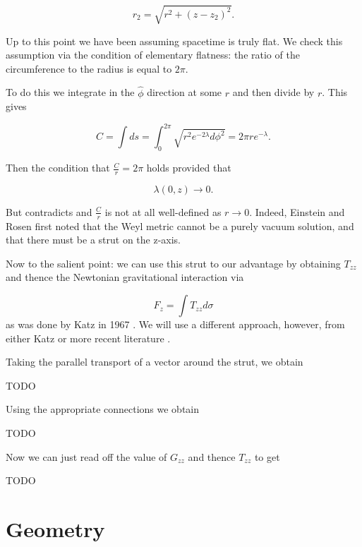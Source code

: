 \documentclass[12pt]{article}
\begin{document}
\begin{equation}
r_2=\sqrt{r^2+(z-z_2)^2}.
\label{eq:r_2}
\end{equation}

Up to this point we have been assuming spacetime is truly flat. We check this assumption via the condition of elementary flatness: the ratio of the circumference to the radius is equal to $2\pi$. 

To do this we integrate in the $\hat{\phi}$ direction at
some $r$ and then divide by $r$. This gives

\begin{equation}
  \label{eq:phi-hat-length}
  C=\int ds =
  \int_0^{2\pi}\sqrt{r^2e^{-2\lambda}d\phi^2}={2\pi re^{-\lambda}}.
\end{equation}

Then the condition that $\frac{C}{r}=2\pi$ holds provided that

\begin{equation}
	\label{eq:lambda-elem-flat}
	\lambda(0,z)\rightarrow 0.
\end{equation} 

But  contradicts  and $\frac{C}{r}$ is not at all well-defined as $r\rightarrow 0$. Indeed, Einstein and Rosen \cite{einstein-rosen-1936} first noted that the Weyl metric cannot be a purely vacuum solution, and that there must be a strut on the z-axis.

Now to the salient point: we can use this strut to our advantage by obtaining $T_{zz}$ and thence the Newtonian gravitational interaction via

\begin{equation}
	\label{eq:F_z}
	F_{z}=\int T_{zz}d\sigma
\end{equation}
as was done by Katz in 1967 \cite{katz1967derivation}. We will use a different approach, however, from either Katz or more recent literature \cite{letelier_superposition_1997}.

Taking the parallel transport of a vector around the strut, we obtain

TODO

Using the appropriate connections we obtain

TODO

Now we can just read off the value of $G_{zz}$ and thence $T_{zz}$ to get

TODO

\section{Geometry}
\end{document}
